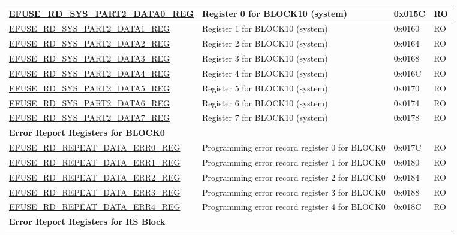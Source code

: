 \begin{longtable}{ | p{7.2cm} | p{6cm} | p{1.3cm} | p{1cm} | }
\hyperref[regdesc:EFUSERDSYSPART2DATANREG]{EFUSE\_RD\_SYS\_PART2\_DATA0\_REG} & Register 0 for BLOCK10 (system) & 0x015C & RO \\ \hline
\hyperref[regdesc:EFUSERDSYSPART2DATANREG]{EFUSE\_RD\_SYS\_PART2\_DATA1\_REG} & Register 1 for BLOCK10 (system) & 0x0160 & RO \\ \hline
\hyperref[regdesc:EFUSERDSYSPART2DATANREG]{EFUSE\_RD\_SYS\_PART2\_DATA2\_REG} & Register 2 for BLOCK10 (system) & 0x0164 & RO \\ \hline
\hyperref[regdesc:EFUSERDSYSPART2DATANREG]{EFUSE\_RD\_SYS\_PART2\_DATA3\_REG} & Register 3 for BLOCK10 (system) & 0x0168 & RO \\ \hline
\hyperref[regdesc:EFUSERDSYSPART2DATANREG]{EFUSE\_RD\_SYS\_PART2\_DATA4\_REG} & Register 4 for BLOCK10 (system) & 0x016C & RO \\ \hline
\hyperref[regdesc:EFUSERDSYSPART2DATANREG]{EFUSE\_RD\_SYS\_PART2\_DATA5\_REG} & Register 5 for BLOCK10 (system) & 0x0170 & RO \\ \hline
\hyperref[regdesc:EFUSERDSYSPART2DATANREG]{EFUSE\_RD\_SYS\_PART2\_DATA6\_REG} & Register 6 for BLOCK10 (system) & 0x0174 & RO \\ \hline
\hyperref[regdesc:EFUSERDSYSPART2DATANREG]{EFUSE\_RD\_SYS\_PART2\_DATA7\_REG} & Register 7 for BLOCK10 (system) & 0x0178 & RO \\ \hline
\multicolumn{4}{|l|}{\textbf{Error Report Registers for BLOCK0}} \\ \hline
\hyperref[regdesc:EFUSERDREPEATDATAERR0REG]{EFUSE\_RD\_REPEAT\_DATA\_ERR0\_REG} & Programming error record register 0 for BLOCK0 & 0x017C & RO \\ \hline
\hyperref[regdesc:EFUSERDREPEATDATAERR1REG]{EFUSE\_RD\_REPEAT\_DATA\_ERR1\_REG} & Programming error record register 1 for BLOCK0 & 0x0180 & RO \\ \hline
\hyperref[regdesc:EFUSERDREPEATDATAERR2REG]{EFUSE\_RD\_REPEAT\_DATA\_ERR2\_REG} & Programming error record register 2 for BLOCK0 & 0x0184 & RO \\ \hline
\hyperref[regdesc:EFUSERDREPEATDATAERR3REG]{EFUSE\_RD\_REPEAT\_DATA\_ERR3\_REG} & Programming error record register 3 for BLOCK0 & 0x0188 & RO \\ \hline
\hyperref[regdesc:EFUSERDREPEATDATAERR4REG]{EFUSE\_RD\_REPEAT\_DATA\_ERR4\_REG} & Programming error record register 4 for BLOCK0 & 0x018C & RO \\ \hline
\multicolumn{4}{|l|}{\textbf{Error Report Registers for RS Block}} \\ \hline

\end{longtable}
